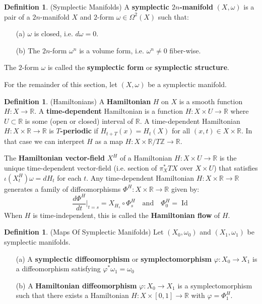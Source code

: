 \documentclass[12pt]{article}
\theoremstyle{definition}
\newtheorem{definition}[theorem]{Definition}
\numberwithin{equation}{section}
\newcommand{\R}{{\mathbb R}}
\newcommand{\Z}{{\mathbb Z}}
\newcommand{\op}{\operatorname}
\begin{document}
\begin{definition} (Symplectic Manifolds) A {\bf symplectic $2n$-manifold} $(X,\omega)$ is a pair of a $2n$-manifold $X$ and $2$-form $\omega \in \Omega^2(X)$ such that:
\begin{enumerate}
	\item[(a)] $\omega$ is closed, i.e. $d\omega = 0$.
	\item[(b)] The $2n$-form $\omega^n$ is a volume form, i.e. $\omega^n \neq 0$ fiber-wise.
\end{enumerate}
The $2$-form $\omega$ is called the {\bf symplectic form} or {\bf symplectic structure}.
\end{definition}

For the remainder of this section, let $(X,\omega)$ be a symplectic manifold.

\begin{definition} (Hamiltonians)  A {\bf Hamiltonian} $H$ on $X$ is a smooth function $H:X \to \R$. A {\bf time-dependent} Hamiltonian is a function $H:X \times U \to \R$ where $U \subset \R$ is some (open or closed) interval of $\R$. A time-dependent Hamiltonian $H:X \times \R \to \R$ is {\bf $T$-periodic} if $H_{t + T}(x) = H_t(X)$ for all $(x,t) \in X \times \R$. In that case we can interpret $H$ as a map $H:X \times \R/T\Z \to \R$.

The {\bf Hamiltonian vector-field} $X^H$ of a Hamiltonian $H:X \times U \to \R$ is the unique time-dependent vector-field (i.e. section of $\pi_X^*TX$ over $X \times U$) that satisfies $\iota(X^H_t)\omega = dH_t$ for each $t$. Any time-dependent Hamiltonian $H:X \times \R \to \R$ generates a family of diffeomorphisms $\Phi^H:X \times \R \to \R$ given by:
\[
\frac{d\Phi^H}{dt}|_{t = s} = X_{H_s} \circ \Phi^H_s \quad\text{and}\quad \Phi^H_0  = \op{Id}
\]
When $H$ is time-independent, this is called the {\bf Hamiltonian flow} of $H$.
\end{definition}

\begin{definition} (Maps Of Symplectic Manifolds) Let $(X_0,\omega_0)$ and $(X_1,\omega_1)$ be symplectic manifolds.
\begin{enumerate}
	\item[(a)] A {\bf symplectic diffeomorphism} or {\bf symplectomorphism} $\varphi:X_0 \to X_1$ is a diffeomorphism satisfying $\varphi^*\omega_1 = \omega_0$
	\item[(b)] A {\bf Hamiltonian diffeomorphism} $\varphi:X_0 \to X_1$ is a symplectomorphism such that there exists a Hamiltonian $H:X \times [0,1] \to \R$ with $\varphi = \Phi^H_1$.
\end{enumerate}
\end{definition}
\end{document}
